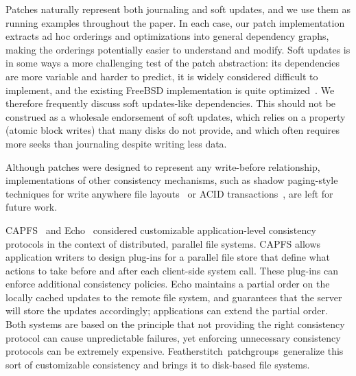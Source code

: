 \documentclass[9pt,twocolumn,letterpaper]{article}
\newcommand{\Kudos}{Featherstitch}
\newcommand{\patchgroups}{patchgroups}
\begin{document}
Patches naturally represent both journaling and soft updates,
and we use them as running examples throughout the paper.
%
In each case, our patch implementation extracts ad hoc orderings and
optimizations into general dependency graphs, making the orderings
potentially easier to understand and modify.
%
Soft updates is in some ways a more challenging test of the patch
abstraction: its dependencies are more variable and harder to predict,
it is widely considered difficult to implement, and the existing FreeBSD
implementation is quite optimized~\cite{mckusick99soft}.
%
We therefore frequently discuss soft updates-like
dependencies.
%
This should not be construed as a wholesale endorsement of soft updates,
which relies on a property (atomic block writes) that many disks do not
provide, and which often requires more seeks than journaling
despite writing less data.

Although patches were designed to represent any write-before relationship,
implementations of other consistency mechanisms, such as shadow
paging-style techniques for write anywhere file
layouts~\cite{hitz94file} or ACID transactions~\cite{wright06extending}, are left for future work.

CAPFS~\cite{vilayannur05providing} and Echo~\cite{mann94coherent}
considered
customizable application-level consistency protocols
in the context of distributed, parallel file systems.
%
CAPFS allows application writers to design plug-ins for a parallel file store
that define what actions to take before and after each client-side system
call.
%
These plug-ins can enforce additional consistency policies.
%
Echo maintains a partial order on the locally cached updates to the remote file
system, and guarantees that the server will store the updates accordingly;
applications can extend the partial order.
%
Both systems are based on the principle that not providing the right
consistency protocol can cause unpredictable failures, yet enforcing
unnecessary consistency protocols can be extremely expensive.
%
%
\Kudos\ \patchgroups\ generalize this sort of customizable consistency
and brings it to disk-based file systems.
\end{document}

